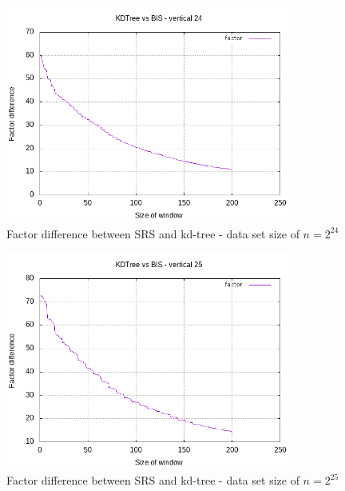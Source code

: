 \begin{figure}[h]
    \centering
    \includegraphics[width = 0.85\textwidth]{pictures/analysis/smalls/vert_fac_24.png}
    \caption{Factor difference between SRS and kd-tree - data set size of $n=2^{24}$}\label{fig:small_vert_fac_24}
\end{figure}

\begin{figure}[h]
    \centering
    \includegraphics[width = 0.85\textwidth]{pictures/analysis/smalls/vert_fac_25.png}
    \caption{Factor difference between SRS and kd-tree - data set size of $n=2^{25}$}\label{fig:small_vert_fac_25}
\end{figure}
\clearpage

